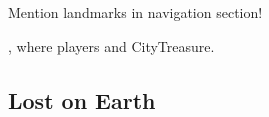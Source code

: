 Mention landmarks in navigation section!

 , where players  and CityTreasure\cite{botturi2009city}. 

\subsection{Lost on Earth}
